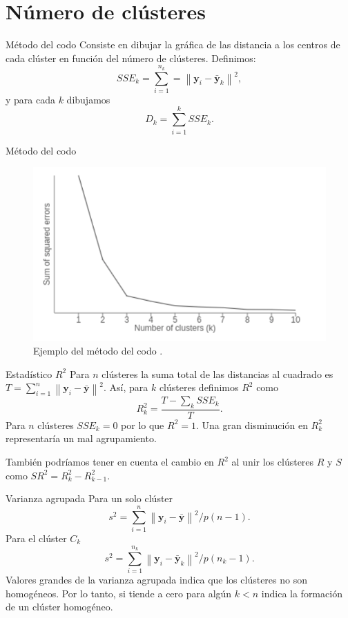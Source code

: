 \documentclass[spanish]{beamer}
\newcommand{\norm}[1]{\left\lVert#1\right\rVert}
\newcommand{\yy}{\textbf{y}}
\begin{document}
\section{Número de clústeres}

\begin{frame}{Método del codo}
	Consiste en dibujar la gráfica de las distancia a los centros de cada clúster en función del número de clústeres. Definimos:
	\[
	SSE_k = \sum_{i = 1}^{n_k} = \norm{\yy_i - \bar{\yy}_k}^2,
	\]
	y para cada $ k $ dibujamos
	\[
	D_k = \sum_{i = 1} ^ {k} SSE_k.
	\]
\end{frame}

\begin{frame}{Método del codo}
	\begin{figure}[h]
		\centering
		\includegraphics[scale=0.5]{pedro/elbowGraph}
		\caption{Ejemplo del método del codo \cite{elbowGraph}.}
		\label{smkm}
	\end{figure}
\end{frame}

\begin{frame}{Estadístico $ R^2 $}
	Para $ n $ clústeres la suma total de las distancias al cuadrado es $ T = \sum_{i = 1}^{n} \norm{\yy_i - \bar{\yy}}^2 $. Así, para $ k $ clústeres definimos $ R^2 $ como
	\[
	R^{2}_{k} = \frac{T - \sum_k SSE_k}{T}.
	\]
	Para $ n $ clústeres $ SSE_k = 0 $ por lo que $ R^2 = 1 $. Una gran disminución en $ R^2_k $ representaría un mal agrupamiento. \break
       
También podríamos tener en cuenta el cambio en $ R^2 $ al unir los clústeres $ R $ y $ S $ como $ SR^2 = R_k^2 - R^2_{k-1} $.
\end{frame}

\begin{frame}{Varianza agrupada}
	Para un solo clúster \[ s^2 = \sum_{i=1}^{n} \norm{\yy_i - \bar{\yy}}^2/ p(n-1).\]
	Para el clúster $ C_k $
	\[
	s^2 = \sum_{i=1}^{n_k} \norm{\yy_i - \bar{\yy}_k}^2/ p(n_k-1).
	\]
	Valores grandes de la varianza agrupada indica que los clústeres no son homogéneos. Por lo tanto, si tiende a cero para algún $  k < n $ indica la formación de un clúster homogéneo.
\end{frame}
\end{document}
